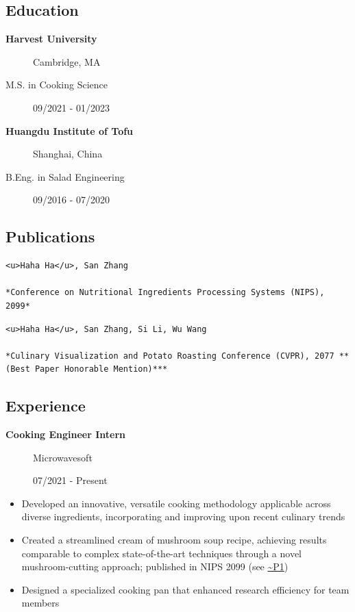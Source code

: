 \documentclass[
]{article}
\author{}
\date{\vspace{-2.5em}}
\providecommand{\tightlist}{%
  \setlength{\itemsep}{0pt}\setlength{\parskip}{0pt}}
\begin{document}
\subsection{Education}\label{education}

\begin{description}
\item[\textbf{Harvest University}]
Cambridge, MA
\item[M.S. in Cooking Science]
09/2021 - 01/2023
\item[\textbf{Huangdu Institute of Tofu}]
Shanghai, China
\item[B.Eng. in Salad Engineering]
09/2016 - 07/2020
\end{description}

\subsection{Publications}\label{publications}

\begin{verbatim}
<u>Haha Ha</u>, San Zhang

*Conference on Nutritional Ingredients Processing Systems (NIPS), 2099*
\end{verbatim}

\begin{verbatim}
<u>Haha Ha</u>, San Zhang, Si Li, Wu Wang

*Culinary Visualization and Potato Roasting Conference (CVPR), 2077 **(Best Paper Honorable Mention)***
\end{verbatim}

\subsection{Experience}\label{experience}

\begin{description}
\item[\textbf{Cooking Engineer Intern}]
Microwavesoft

07/2021 - Present
\end{description}

\begin{itemize}
\tightlist
\item
  Developed an innovative, versatile cooking methodology applicable
  across diverse ingredients, incorporating and improving upon recent
  culinary trends
\item
  Created a streamlined cream of mushroom soup recipe, achieving results
  comparable to complex state-of-the-art techniques through a novel
  mushroom-cutting approach; published in NIPS 2099 (see
  \href{**Eating\%20is\%20All\%20You\%20Need**}{\textasciitilde P1})
\item
  Designed a specialized cooking pan that enhanced research efficiency
  for team members
\end{itemize}
\end{document}
